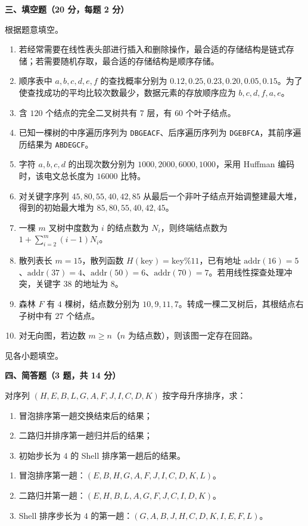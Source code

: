 \textbf{三、填空题（20 分，每题 2 分）}
\begin{question}
根据题意填空。
\begin{enumerate}
  \item 若经常需要在线性表头部进行插入和删除操作，最合适的存储结构是链式存储；若需要随机存取，最合适的存储结构是顺序存储。
  \item 顺序表中 $a,b,c,d,e,f$ 的查找概率分别为 $0.12,0.25,0.23,0.20,0.05,0.15$。为了使查找成功的平均比较次数最少，数据元素的存放顺序应为 $b,c,d,f,a,e$。
  \item 含 $120$ 个结点的完全二叉树共有 $7$ 层，有 $60$ 个叶子结点。
  \item 已知一棵树的中序遍历序列为 \texttt{DBGEACF}、后序遍历序列为 \texttt{DGEBFCA}，其前序遍历结果为 \texttt{ABDEGCF}。
  \item 字符 $a,b,c,d$ 的出现次数分别为 $1000,2000,6000,1000$，采用 Huffman 编码时，该电文总长度为 $16000$ 比特。
  \item 对关键字序列 $45,80,55,40,42,85$ 从最后一个非叶子结点开始调整建最大堆，得到的初始最大堆为 $85,80,55,40,42,45$。
  \item 一棵 $m$ 叉树中度数为 $i$ 的结点数为 $N_i$，则终端结点数为 $1+\sum_{i=2}^{m}(i-1)N_i$。
  \item 散列表长 $m=15$，散列函数 $H(\mathrm{key})=\mathrm{key}\%11$，已有地址 $\mathrm{addr}(16)=5$、$\mathrm{addr}(37)=4$、$\mathrm{addr}(50)=6$、$\mathrm{addr}(70)=7$。若用线性探查处理冲突，关键字 $38$ 的地址为 $8$。
  \item 森林 $F$ 有 $4$ 棵树，结点数分别为 $10,9,11,7$。转成一棵二叉树后，其根结点右子树中有 $27$ 个结点。
  \item 对无向图，若边数 $m\ge n$（$n$ 为结点数），则该图一定存在回路。
\end{enumerate}
\begin{solution}
见各小题填空。
\end{solution}
\end{question}

\textbf{四、简答题（3 题，共 14 分）}
\begin{question}
对序列 $(H,E,B,L,G,A,F,J,I,C,D,K)$ 按字母升序排序，求：
\begin{enumerate}
  \item 冒泡排序第一趟交换结束后的结果；
  \item 二路归并排序第一趟归并后的结果；
  \item 初始步长为 $4$ 的 Shell 排序第一趟后的结果。
\end{enumerate}
\begin{solution}
\begin{enumerate}
  \item 冒泡排序第一趟：$(E,B,H,G,A,F,J,I,C,D,K,L)$。
  \item 二路归并第一趟：$(E,H,B,L,A,G,F,J,C,I,D,K)$。
  \item Shell 排序步长为 $4$ 的第一趟：$(G,A,B,J,H,C,D,K,I,E,F,L)$。
\end{enumerate}
\end{solution}
\end{question}

